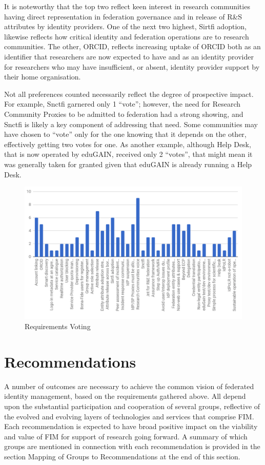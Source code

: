 \documentclass[fleqn,10pt]{wlscirep}
\begin{document}
{It is noteworthy that the top two reflect keen interest in research communities having direct representation in federation governance and in release of R\&S attributes by identity providers. One of the next two highest, Sirtfi adoption, likewise reflects how critical identity and federation operations are to research communities. The other, ORCID, reflects increasing uptake of ORCID both as an identifier that researchers are now expected to have and as an identity provider for researchers who may have insufficient, or absent, identity provider support by their home organisation.

Not all preferences counted necessarily reflect the degree of prospective impact. For example, Snctfi garnered only 1 “vote”; however, the need for Research Community Proxies to be admitted to federation had a strong showing, and Snctfi is likely a key component of addressing that need. Some communities may have chosen to “vote” only for the one knowing that it depends on the other, effectively getting two votes for one. As another example, although Help Desk, that is now operated by eduGAIN, received only 2 “votes”, that might mean it was generally taken for granted given that eduGAIN is already running a Help Desk. 

\begin{figure}[ht!]
  \centering
  \includegraphics[width=0.7\columnwidth]{RequirementsVoting.png}
  \caption{Requirements Voting}
  \label{fig:voting}
\end{figure}

\section{Recommendations}
A number of outcomes are necessary to achieve the common vision of federated identity management, based on the requirements gathered above. All depend upon the substantial participation and cooperation of several groups, reflective of the evolved and evolving layers of technologies and services that comprise FIM. Each recommendation is expected to have broad positive impact on the viability and value of FIM for support of research going forward. A summary of which groups are mentioned in connection with each recommendation is provided in the section Mapping of Groups to Recommendations at the end of this section.
}
\end{document}
